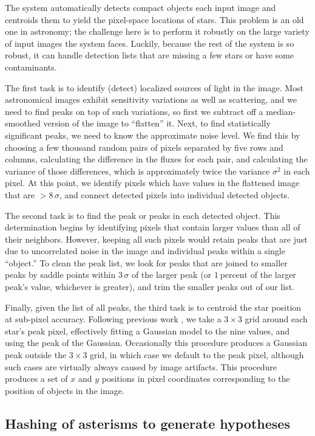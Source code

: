 \documentclass[12pt,preprint]{aastex}
\newcommand{\unit}[1]{\mathrm{#1}}
\newcommand{\percent}{\unit{percent}}
\renewcommand{\%}{\percent}
\begin{document}
The system automatically detects compact objects each input image and
centroids them to yield the pixel-space locations of stars. This
problem is an old one in astronomy; the challenge here is to perform
it robustly on the large variety of input images the system
faces. Luckily, because the rest of the system is so robust, it can
handle detection lists that are missing a few stars or have some
contaminants.

The first task is to identify (detect) localized sources of light in
the image.  Most astronomical images exhibit sensitivity variations as
well as scattering, and we need to find peaks on top of such
variations, so first we subtract off a median-smoothed version of the
image to ``flatten'' it. Next, to find statistically significant
peaks, we need to know the approximate noise level.  We find this by
choosing a few thousand random pairs of pixels separated by five rows
and columns, calculating the difference in the fluxes for each pair,
and calculating the variance of those differences, which is
approximately twice the variance $\sigma^2$ in each pixel. At this
point, we identify pixels which have values in the flattened image
that are $>8\,\sigma$, and connect detected pixels into individual
detected objects.

The second task is to find the peak or peaks in each detected object.
This determination begins by identifying pixels that contain larger
values than all of their neighbors. However, keeping all such pixels
would retain peaks that are just due to uncorrelated noise in the
image and individual peaks within a single ``object.'' To clean the
peak list, we look for peaks that are joined to smaller peaks by
saddle points within $3\,\sigma$ of the larger peak (or $1~\percent$
of the larger peak's value, whichever is greater), and trim the
smaller peaks out of our list.

Finally, given the list of all peaks, the third task is to centroid
the star position at sub-pixel accuracy. Following previous work
\citep{lupton}, we take a $3\times 3$ grid around each star's peak
pixel, effectively fitting a Gaussian model to the nine values, and
using the peak of the Gaussian. Occasionally this procedure produces a
Gaussian peak outside the $3\times 3$ grid, in which case we default
to the peak pixel, although such cases are virtually always caused by
image artifacts.  This procedure produces a set of $x$ and $y$
positions in pixel coordinates corresponding to the position of
objects in the image.

\subsection{Hashing of asterisms to generate hypotheses}
\end{document}
